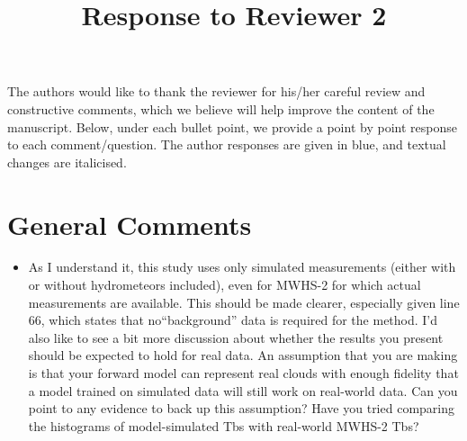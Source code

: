 \documentclass[11pt,a4paper]{article}
\begin{document}
	
\title{\textbf{Response to Reviewer 2}}
\date{}
\maketitle	

The authors would like to thank the reviewer for his/her careful review and constructive comments, which we believe will help improve the content of the manuscript.  Below, under each bullet point, we provide a point by point response to each comment/question. The author responses are given in blue, and textual changes are italicised.  

\section*{General Comments}
\begin{itemize}

\item 			
			As I understand it, this study uses only simulated measurements (either with or without hydrometeors included), even for MWHS-2 for which actual measurements are available. This should be made clearer, especially given line 66, which states that no``background'' data is required for the method. I'd also like to see a bit more discussion 	about whether the results you present should be expected to hold for real data. An assumption that you are making is that your forward model can represent real clouds with enough fidelity that a model trained on simulated data will still work on real-world data. Can you point to any evidence to back up this assumption? Have you tried comparing the histograms of model-simulated Tbs with real-world MWHS-2 Tbs?\\



\end{itemize}
\end{document}

